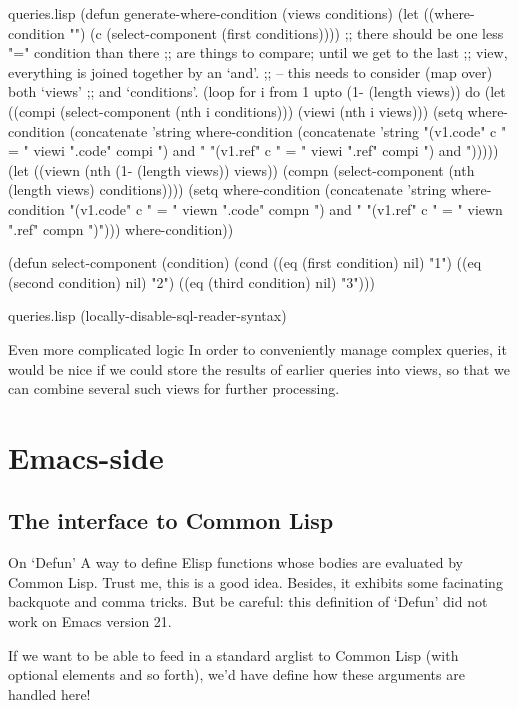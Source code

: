 \begin{common}{queries.lisp}
(defun generate-where-condition (views conditions)
  (let ((where-condition "")
        (c (select-component (first conditions))))
    ;; there should be one less "=" condition than there
    ;; are things to compare; until we get to the last
    ;; view, everything is joined together by an `and'.
    ;; -- this needs to consider (map over) both `views'
    ;; and `conditions'.
    (loop
     for i from 1 upto (1- (length views))
     do
     (let ((compi (select-component (nth i conditions)))
           (viewi (nth i views)))
       (setq
        where-condition
        (concatenate
         'string
         where-condition
         (concatenate
          'string
          "(v1.code" c " = " viewi ".code" compi ") and "
          "(v1.ref" c " = " viewi ".ref" compi ") and ")))))
    (let ((viewn (nth (1- (length views)) views))
          (compn (select-component
                    (nth (length views) conditions))))
      (setq
       where-condition
       (concatenate
        'string
        where-condition
        "(v1.code" c " = " viewn ".code" compn ") and "
        "(v1.ref" c " = " viewn ".ref" compn ")")))
    where-condition))

(defun select-component (condition)
  (cond ((eq (first condition) nil) "1")
        ((eq (second condition) nil) "2")
        ((eq (third condition) nil) "3")))
\end{common}

\begin{common}{queries.lisp}
(locally-disable-sql-reader-syntax)
\end{common}

\begin{notate}{Even more complicated logic}
In order to conveniently manage complex queries, it would
be nice if we could store the results of earlier queries
into views, so that we can combine several such views for
further processing.
\end{notate}

\section{Emacs-side} \label{emacs-side}

\subsection{The interface to Common Lisp}

\begin{notate}{On `Defun'} \label{defun-interface}
A way to define Elisp functions whose bodies are evaluated
by Common Lisp.  Trust me, this is a good idea.  Besides,
it exhibits some facinating backquote and comma tricks.
But be careful: this definition of `Defun' did not work on
Emacs version 21.

If we want to be able to feed in a standard arglist to
Common Lisp (with optional elements and so forth), we'd
have define how these arguments are handled here!
\end{notate}

